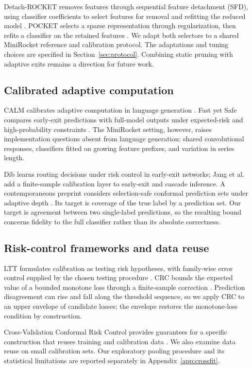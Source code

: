 \documentclass[pdflatex,sn-basic,Numbered]{sn-jnl}
\begin{document}
Detach-ROCKET removes features through sequential feature detachment (SFD), using classifier coefficients to select features for removal and refitting the reduced model \cite{detach}. POCKET selects a sparse representation through regularization, then refits a classifier on the retained features \cite{pocket}. We adapt both selectors to a shared MiniRocket reference and calibration protocol. The adaptations and tuning choices are specified in Section~\ref{sec:protocol}. Combining static pruning with adaptive exits remains a direction for future work.

\subsection{Calibrated adaptive computation}
CALM calibrates adaptive computation in language generation \cite{calm}. Fast yet Safe compares early-exit predictions with full-model outputs under expected-risk and high-probability constraints \cite{fastsafe}. The MiniRocket setting, however, raises implementation questions absent from language generation: shared convolutional responses, classifiers fitted on growing feature prefixes, and variation in series length.

Dib \cite{dib2026} learns routing decisions under risk control in early-exit networks; Jang et al.~\cite{carc2026} add a finite-sample calibration layer to early-exit and cascade inference. A contemporaneous preprint considers selection-safe conformal prediction sets under adaptive depth \cite{selection2026}. Its target is coverage of the true label by a prediction set. Our target is agreement between two single-label predictions, so the resulting bound concerns fidelity to the full classifier rather than its absolute correctness.

\subsection{Risk-control frameworks and data reuse}
LTT formulates calibration as testing risk hypotheses, with family-wise error control supplied by the chosen testing procedure \cite{ltt}. CRC bounds the expected value of a bounded monotone loss through a finite-sample correction \cite{crc}. Prediction disagreement can rise and fall along the threshold sequence, so we apply CRC to an upper envelope of candidate losses; the envelope restores the monotone-loss condition by construction.

Cross-Validation Conformal Risk Control provides guarantees for a specific construction that reuses training and calibration data \cite{cvcrc}. We also examine data reuse on small calibration sets. Our exploratory pooling procedure and its statistical limitations are reported separately in Appendix~\ref{app:crossfit}.
\end{document}
